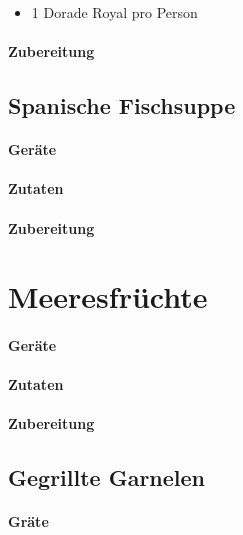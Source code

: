 \begin{itemize}[noitemsep]
	\item 1 Dorade Royal pro Person
	
\end{itemize}

\paragraph{Zubereitung}

\subsection{Spanische Fischsuppe}

\paragraph{Geräte}


\paragraph{Zutaten}

\paragraph{Zubereitung}

\section{Meeresfrüchte}

\paragraph{Geräte}

\paragraph{Zutaten}

\paragraph{Zubereitung}


\subsection{Gegrillte Garnelen}

\paragraph{Gräte}

